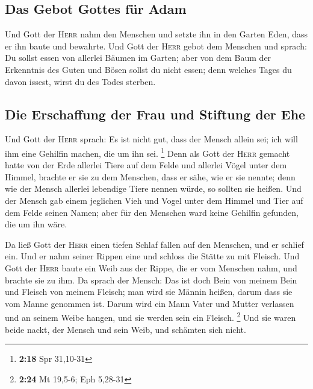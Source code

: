 \hypertarget{das-gebot-gottes-fuxfcr-adam}{%
\subsection{Das Gebot Gottes für
Adam}\label{das-gebot-gottes-fuxfcr-adam}}

 Und Gott der \textsc{Herr} nahm den Menschen und setzte
ihn in den Garten Eden, dass er ihn baute und bewahrte. 
Und Gott der \textsc{Herr} gebot dem Menschen und sprach: Du sollst
essen von allerlei Bäumen im Garten;  aber von dem Baum
der Erkenntnis des Guten und Bösen sollst du nicht essen; denn welches
Tages du davon issest, wirst du des Todes sterben.

\hypertarget{die-erschaffung-der-frau-und-stiftung-der-ehe}{%
\subsection{Die Erschaffung der Frau und Stiftung der
Ehe}\label{die-erschaffung-der-frau-und-stiftung-der-ehe}}

 Und Gott der \textsc{Herr} sprach: Es ist nicht gut,
dass der Mensch allein sei; ich will ihm eine Gehilfin machen, die um
ihn sei. \footnote{\textbf{2:18} Spr 31,10-31}  Denn als
Gott der \textsc{Herr} gemacht hatte von der Erde allerlei Tiere auf dem
Felde und allerlei Vögel unter dem Himmel, brachte er sie zu dem
Menschen, dass er sähe, wie er sie nennte; denn wie der Mensch allerlei
lebendige Tiere nennen würde, so sollten sie heißen.  Und
der Mensch gab einem jeglichen Vieh und Vogel unter dem Himmel und Tier
auf dem Felde seinen Namen; aber für den Menschen ward keine Gehilfin
gefunden, die um ihn wäre.

 Da ließ Gott der \textsc{Herr} einen tiefen Schlaf
fallen auf den Menschen, und er schlief ein. Und er nahm seiner Rippen
eine und schloss die Stätte zu mit Fleisch.  Und Gott der
\textsc{Herr} baute ein Weib aus der Rippe, die er vom Menschen nahm,
und brachte sie zu ihm.  Da sprach der Mensch: Das ist
doch Bein von meinem Bein und Fleisch von meinem Fleisch; man wird sie
Männin heißen, darum dass sie vom Manne genommen ist. 
Darum wird ein Mann Vater und Mutter verlassen und an seinem Weibe
hangen, und sie werden sein ein Fleisch. \footnote{\textbf{2:24} Mt
  19,5-6; Eph 5,28-31}  Und sie waren beide nackt, der
Mensch und sein Weib, und schämten sich nicht.

